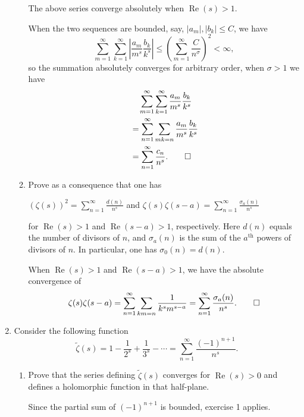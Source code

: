 \documentclass[11pt]{report}
\theoremstyle{mythm}
\let\oldendproof\endproof
\renewenvironment{proof}[1][\proofname]{%
  \oldproof[\normalfont \bfseries #1]%
}{\oldendproof}
\renewcommand*{\proofname}{Proof}
\theoremstyle{myans}
\renewcommand{\Re}{\operatorname{Re}}
\begin{document}
\begin{enumerate}
\begin{enumerate}
    The above series converge absolutely when $\Re(s) > 1$.
    \begin{proof}
      When the two sequences are bounded, say, $|a_m|, |b_k|\leq C$, we have
      \[ \sum_{m=1}^\infty \sum_{k=1}^\infty \left| \frac{a_m}{m^s}
      \frac{b_k}{k^s} \right|
      \leq \left(\sum_{m=1}^\infty \frac{C}{n^{\sigma}}\right)^2 < \infty, \]
      so the summation absolutely converges for arbitrary order, when $\sigma>1$ we have
      \begin{align*}
        &\quad \sum_{m=1}^\infty \sum_{k=1}^\infty \frac{a_m}{m^s}
        \frac{b_k}{k^s}\\
        &= \sum_{n=1}^\infty \sum_{mk=n} \frac{a_m}{m^s}
        \frac{b_k}{k^s}\\
        &= \sum_{n=1}^\infty \frac{c_n}{n^s}. \qedhere
      \end{align*}
    \end{proof}
    \item Prove as a consequence that one has
    \begin{center}
      $\displaystyle (\zeta(s))^2 = \sum_{n=1}^\infty \frac{d(n)}{n^s}$
      \quad and \quad $\displaystyle \zeta(s)\zeta(s-a) = \sum_{n=1}^\infty \frac{\sigma_a(n)}{n^s}$
    \end{center}
    for $\Re(s) > 1$ and $\Re(s - a) > 1$, respectively. Here $d(n)$ equals the number
    of divisors of $n$, and $\sigma_a(n)$ is the sum of the $a^{\text{th}}$ powers of divisors of $n$. In particular,
    one has $\sigma_0(n) = d(n)$.
    \begin{proof}
      When $\Re(s) > 1$ and $\Re(s-a)>1$, we have the absolute convergence of
      \[ \zeta(s)\zeta(s-a) = \sum_{n=1}^\infty \sum_{km=n} \frac{1}{k^sm^{s-a}}
      = \sum_{n=1}^\infty \frac{\sigma_a(n)}{n^s}. \qedhere \]
    \end{proof}
  \end{enumerate}
  \setcounter{enumi}{4}
  \item Consider the following function
  \[ \tilde \zeta(s) = 1 - \frac 1{2^s} + \frac 1{3^s} - \cdots = \sum_{n=1}^\infty \frac{(-1)^{n+1}}{n^s}. \]
  \begin{enumerate}
    \item Prove that the series defining $\tilde \zeta(s)$ converges for $\Re(s) > 0$ and defines a
    holomorphic function in that half-plane.
    \begin{proof}
      Since the partial sum of $(-1)^{n+1}$ is bounded, exercise 1 applies.
    \end{proof}

\end{enumerate}
\end{enumerate}
\end{document}
